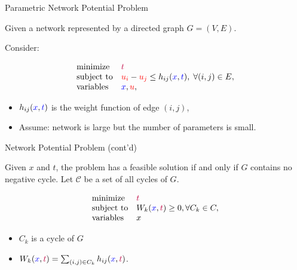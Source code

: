 \documentclass[10pt,ignorenonframetext,serif,onlymath]{beamer}
\begin{document}
\begin{frame}{Parametric Network Potential Problem}
\protect\hypertarget{parametric-network-potential-problem-1}{}

Given a network represented by a directed graph \(G = (V, E)\).

Consider:

\[\begin{array}{ll}
    \text{minimize} & {\color{purple}t} \\
    \text{subject to} & {\color{red}u_i} - {\color{red}u_j} \le h_{ij}({\color{blue}x}, {\color{blue}t}), \; \forall (i, j) \in E ,\\
    \text{variables} &{\color{blue}x}, {\color{red}u} ,
   \end{array}\]

\begin{itemize}
\item
  \(h_{ij}({\color{blue}x}, {\color{blue}t})\) is the weight function of
  edge \((i,j)\),
\item
  Assume: network is large but the number of parameters is small.
\end{itemize}

\end{frame}

\begin{frame}{Network Potential Problem (cont’d)}
\protect\hypertarget{network-potential-problem-contd}{}

Given \(x\) and \(t\), the problem has a feasible solution if and only
if \(G\) contains no negative cycle. Let \(\mathcal{C}\) be a set of all
cycles of \(G\).

\[\begin{array}{ll}
    \text{minimize} & {\color{purple}t} \\
    \text{subject to} & W_k({\color{blue}x}, {\color{purple}t}) \ge 0, \forall C_k \in C ,\\
       \text{variables} & x
   \end{array}\]

\begin{itemize}
\item
  \(C_k\) is a cycle of \(G\)
\item
  \(W_k({\color{blue}x}, {\color{purple}t}) = \sum_{ (i,j)\in C_k} h_{ij}({\color{blue}x}, {\color{purple}t})\).
\end{itemize}

\end{frame}
\end{document}
